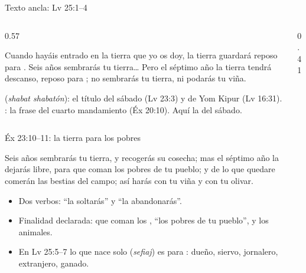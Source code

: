 \begin{frame}{Texto ancla: Lv 25:1--4}
\begin{columns}[c,onlytextwidth]
\begin{column}{0.57\textwidth}
\begin{cita}Cuando hayáis entrado en la tierra que yo os doy, la tierra guardará reposo para \SENOR. Seis años sembrarás tu tierra\ldots{} Pero el séptimo año la tierra tendrá descanso, reposo para \SENOR; no sembrarás tu tierra, ni podarás tu viña.\end{cita}
\scriptsize {} (\emph{shabat shabatón}): el título del sábado (Lv 23:3) y de Yom Kipur (Lv 16:31). : la frase del cuarto mandamiento (Éx 20:10). Aquí la  del sábado.
\end{column}
\begin{column}{0.41\textwidth}\end{column}
\end{columns}
\end{frame}

\begin{frame}{Éx 23:10--11: la tierra para los pobres}
\begin{center}\end{center}
\begin{cita}Seis años sembrarás tu tierra, y recogerás su cosecha; mas el séptimo año la dejarás libre, para que coman los pobres de tu pueblo; y de lo que quedare comerán las bestias del campo; así harás con tu viña y con tu olivar.\end{cita}
\small
\begin{itemize}
\item Dos verbos:  ``la soltarás'' y  ``la abandonarás''.
\item Finalidad declarada: que coman los , ``los pobres de tu pueblo'', y los animales.
\item En Lv 25:5--7 lo que nace solo (\emph{sefiaj}) es para : dueño, siervo, jornalero, extranjero, ganado.
\end{itemize}
\end{frame}

